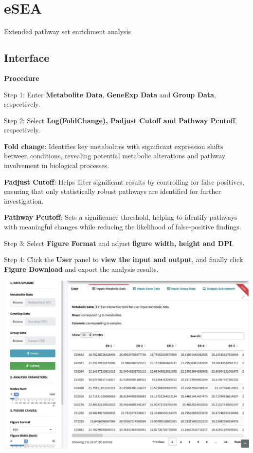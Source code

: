 \documentclass[
]{book}
\begin{document}
\section{eSEA}\label{esea}

Extended pathway set enrichment analysis

\subsection{Interface}\label{interface-3}

\textbf{Procedure}

Step 1: Enter \textbf{Metabolite Data}, \textbf{GeneExp Data} and \textbf{Group Data}, respectively.

Step 2: Select \textbf{Log(FoldChange), Padjust Cutoff and Pathway Pcutoff}, respectively.

\textbf{Fold change}: Identifies key metabolites with significant expression shifts between conditions, revealing potential metabolic alterations and pathway involvement in biological processes.

\textbf{Padjust Cutoff}: Helps filter significant results by controlling for false positives, ensuring that only statistically robust pathways are identified for further investigation.

\textbf{Pathway Pcutoff}: Sets a significance threshold, helping to identify pathways with meaningful changes while reducing the likelihood of false-positive findings.

Step 3: Select \textbf{Figure Format} and adjust \textbf{figure width, height and DPI}.

Step 4: Click the \textbf{User} panel to \textbf{view the input and output}, and finally click \textbf{Figure Download} and export the analysis results.

\begin{center}\includegraphics[width=33.5in]{figure/1.M-G} \end{center}
\end{document}
